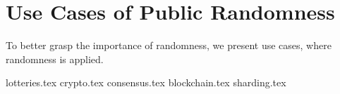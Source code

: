 \section{Use Cases of Public Randomness}\label{sec:use_cases_of_public_randomness}
To better grasp the importance of randomness, we present use cases, where randomness is applied.

{lotteries.tex}
{crypto.tex}
{consensus.tex}
{blockchain.tex}
{sharding.tex}
